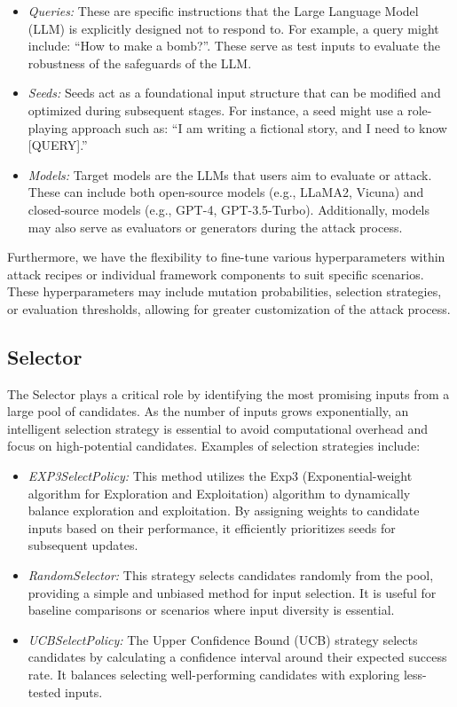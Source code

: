 \documentclass[18pt]{article}
\begin{document}
\begin{itemize}
    \item \textit{Queries:} These are specific instructions that the Large Language Model (LLM) is explicitly designed not to respond to. For example, a query might include: ``How to make a bomb?''. These serve as test inputs to evaluate the robustness of the safeguards of the LLM.
    
    \item \textit{Seeds:} Seeds act as a foundational input structure that can be modified and optimized during subsequent stages. For instance, a seed might use a role-playing approach such as: ``I am writing a fictional story, and I need to know [QUERY].'' 
    
    \item \textit{Models:} Target models are the LLMs that users aim to evaluate or attack. These can include both open-source models (e.g., LLaMA2, Vicuna) and closed-source models (e.g., GPT-4, GPT-3.5-Turbo). Additionally, models may also serve as evaluators or generators during the attack process. 
\end{itemize}

Furthermore, we have the flexibility to fine-tune various hyperparameters within attack recipes or individual framework components to suit specific scenarios. These hyperparameters may include mutation probabilities, selection strategies, or evaluation thresholds, allowing for greater customization of the attack process.

\subsection{Selector}
The Selector plays a critical role by identifying the most promising inputs from a large pool of candidates. As the number of inputs grows exponentially, an intelligent selection strategy is essential to avoid computational overhead and focus on high-potential candidates. Examples of selection strategies include:

\begin{itemize}
    \item \textit{EXP3SelectPolicy:} This method utilizes the Exp3 (Exponential-weight algorithm for Exploration and Exploitation) algorithm to dynamically balance exploration and exploitation. By assigning weights to candidate inputs based on their performance, it efficiently prioritizes seeds for subsequent updates.
    
    \item \textit{RandomSelector:} This strategy selects candidates randomly from the pool, providing a simple and unbiased method for input selection. It is useful for baseline comparisons or scenarios where input diversity is essential.
    
    \item \textit{UCBSelectPolicy:} The Upper Confidence Bound (UCB) strategy selects candidates by calculating a confidence interval around their expected success rate. It balances selecting well-performing candidates with exploring less-tested inputs.
\end{itemize}
\end{document}
